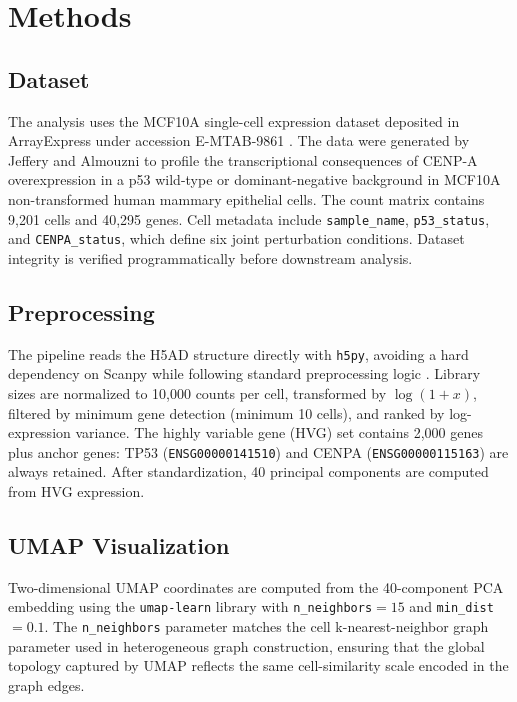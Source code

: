 \section{Methods}

\subsection{Dataset}

The analysis uses the MCF10A single-cell expression dataset deposited in
ArrayExpress under accession E-MTAB-9861 \citep{jeffery2022cenpa}.
The data were generated by Jeffery and Almouzni to profile the transcriptional
consequences of CENP-A overexpression in a p53 wild-type or dominant-negative
background in MCF10A non-transformed human mammary epithelial cells.
The count matrix contains 9,201 cells and 40,295 genes.
Cell metadata include \texttt{sample\_name}, \texttt{p53\_status},
and \texttt{CENPA\_status}, which define six joint perturbation conditions.
Dataset integrity is verified programmatically before downstream analysis.

\subsection{Preprocessing}

The pipeline reads the H5AD structure directly with \texttt{h5py}, avoiding a
hard dependency on Scanpy while following standard preprocessing logic
\citep{scanpy_preprocessing}.
Library sizes are normalized to 10,000 counts per cell, transformed by
$\log(1+x)$, filtered by minimum gene detection (minimum 10 cells), and ranked
by log-expression variance.
The highly variable gene (HVG) set contains 2,000 genes plus anchor genes:
TP53 (\texttt{ENSG00000141510}) and CENPA (\texttt{ENSG00000115163}) are always
retained.
After standardization, 40 principal components are computed from HVG expression.

\subsection{UMAP Visualization}

Two-dimensional UMAP coordinates are computed from the 40-component PCA embedding
using the \texttt{umap-learn} library \citep{mcinnes2018umap} with
\texttt{n\_neighbors}$=15$ and \texttt{min\_dist}$=0.1$.
The \texttt{n\_neighbors} parameter matches the cell k-nearest-neighbor graph
parameter used in heterogeneous graph construction, ensuring that the global
topology captured by UMAP reflects the same cell-similarity scale encoded in
the graph edges.

